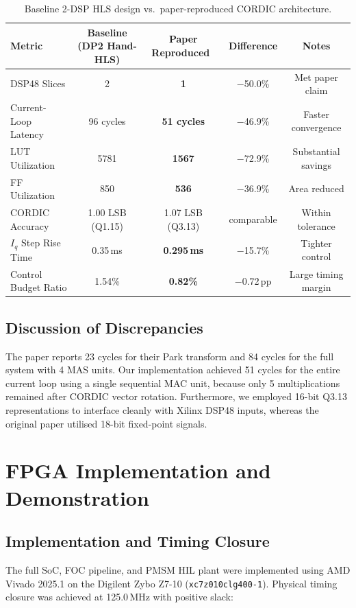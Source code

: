 \documentclass[11pt,a4paper]{article}
\begin{document}
\begin{table}[H]\centering\small
\caption{Baseline 2-DSP HLS design vs.\ paper-reproduced CORDIC architecture.}\label{tab:paper}
\begin{tabular}{@{}lcccc@{}}
\toprule
Metric & Baseline (DP2 Hand-HLS) & Paper Reproduced~\cite{tufekci2020} & Difference & Notes\\
\midrule
DSP48 Slices & 2 & \textbf{1} & $-$50.0\% & Met paper claim\\
Current-Loop Latency & 96 cycles & \textbf{51 cycles} & $-$46.9\% & Faster convergence\\
LUT Utilization & 5781 & \textbf{1567} & $-$72.9\% & Substantial savings\\
FF Utilization & 850 & \textbf{536} & $-$36.9\% & Area reduced\\
CORDIC Accuracy & 1.00 LSB (Q1.15) & 1.07 LSB (Q3.13) & comparable & Within tolerance\\
$I_q$ Step Rise Time & 0.35\,ms & \textbf{0.295\,ms} & $-$15.7\% & Tighter control\\
Control Budget Ratio & 1.54\% & \textbf{0.82\%} & $-$0.72\,pp & Large timing margin\\
\bottomrule
\end{tabular}
\end{table}

\subsection{Discussion of Discrepancies}
The paper reports 23 cycles for their Park transform and 84 cycles for the full system with 4 MAS units. Our implementation achieved 51 cycles for the entire current loop using a single sequential MAC unit, because only 5 multiplications remained after CORDIC vector rotation. Furthermore, we employed 16-bit Q3.13 representations to interface cleanly with Xilinx DSP48 inputs, whereas the original paper utilised 18-bit fixed-point signals.

\section{FPGA Implementation and Demonstration}
\label{sec:fpga}

\subsection{Implementation and Timing Closure}
The full SoC, FOC pipeline, and PMSM HIL plant were implemented using AMD Vivado 2025.1 on the Digilent Zybo Z7-10 (\texttt{xc7z010clg400-1}). Physical timing closure was achieved at 125.0\,MHz with positive slack:
\end{document}
